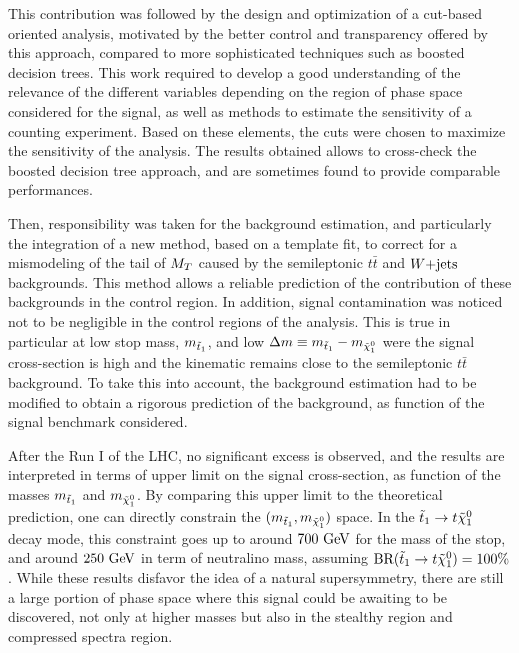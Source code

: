 This contribution was followed by the design and optimization of a cut-based oriented
analysis, motivated by the better control and transparency offered by this approach,
compared to more sophisticated techniques such as boosted decision trees.
This work required to develop a good understanding of the relevance of the different
variables depending on the region of phase space considered for the signal, as well as methods
to estimate the sensitivity of a counting experiment. Based on these elements, the
cuts were chosen to maximize the sensitivity of the analysis. The results obtained
allows to cross-check the boosted decision tree approach, and are sometimes found to
provide comparable performances.

Then, responsibility was taken for the background estimation, and particularly the integration
of a new method, based on a template fit, to correct for a mismodeling of the tail of $M_T$ caused
by the semileptonic $t\bar{t}$ and $\text{$W$+jets}$ backgrounds. This method allows a reliable
prediction of the contribution of these backgrounds in the control region. In addition, signal
contamination was noticed not to be negligible in the control regions of the analysis. This
is true in particular at low stop mass, $m_{\tilde{t}_1}$, and low $\Delta m \equiv m_{\tilde{t}_1} -
m_{\tilde{\chi}_1^0}$ were the signal cross-section is high and the kinematic remains close
to the semileptonic $t\bar{t}$ background. To take this into account, the background estimation
had to be modified to obtain a rigorous prediction of the background, as function of the signal
benchmark considered.

After the Run I of the LHC, no significant excess is observed, and the results are
interpreted in terms of upper limit on the signal cross-section, as function of the masses
$m_{\tilde{t}_1}$ and $m_{\tilde{\chi}_1^0}$. By comparing
this upper limit to the theoretical prediction, one can directly constrain the
$(m_{\tilde{t}_1},m_{\tilde{\chi}_1^0})$ space. In the $\tilde{t}_1 \rightarrow t \tilde{\chi}_1^0$
decay mode, this constraint goes up to around $700~\text{GeV}$ for the mass of the stop,
and around $250~\text{GeV}$ in term of neutralino mass, assuming $\text{BR}(\tilde{t}_1 \rightarrow t
\tilde{\chi}_1^0) = 100\%$. While these results disfavor the idea of a natural supersymmetry,
there are still a large portion of phase space where this signal could be awaiting to be
discovered, not only at higher masses but also in the stealthy region and compressed spectra region.

